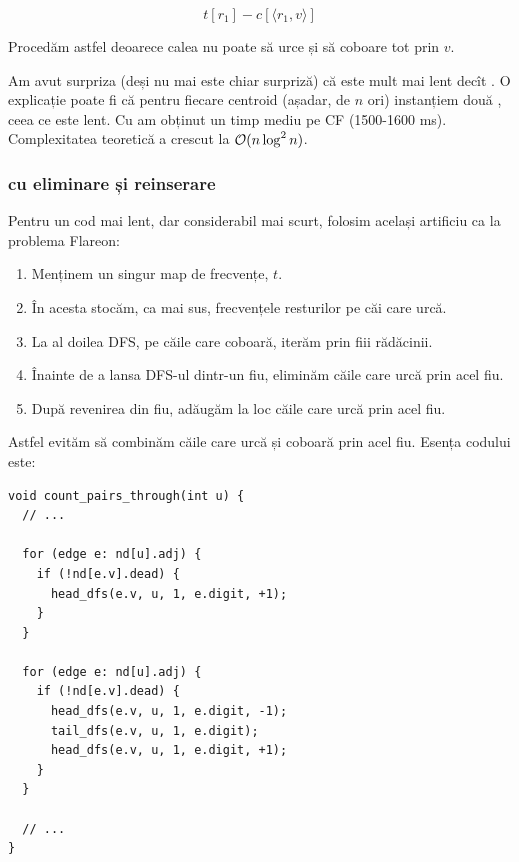 \documentclass[../main.tex]{subfiles}
\begin{document}
$$t[r_1] - c[\langle r_1, v \rangle]$$

Procedăm astfel deoarece calea nu poate să urce și să coboare tot prin $v$.

Am avut surpriza (deși nu mai este chiar surpriză) că  este mult mai lent decît . O explicație poate fi că pentru fiecare centroid (așadar, de $n$ ori) instanțiem două , ceea ce este lent. Cu  am obținut un timp mediu pe CF (1500-1600 ms). Complexitatea teoretică a crescut la $\mathcal{O}(n \log^2 n)$.

\subsubsection*{ cu eliminare și reinserare}

Pentru un cod mai lent, dar considerabil mai scurt, folosim același artificiu ca la problema Flareon:

\begin{enumerate}
  \item Menținem un singur map de frecvențe, $t$.

  \item În acesta stocăm, ca mai sus, frecvențele resturilor pe căi care urcă.

  \item La al doilea DFS, pe căile care coboară, iterăm prin fiii rădăcinii.

  \item Înainte de a lansa DFS-ul dintr-un fiu, eliminăm căile care urcă prin acel fiu.

  \item După revenirea din fiu, adăugăm la loc căile care urcă prin acel fiu.
\end{enumerate}

Astfel evităm să combinăm căile care urcă și coboară prin acel fiu. Esența codului este:

\begin{verbatim}
void count_pairs_through(int u) {
  // ...

  for (edge e: nd[u].adj) {
    if (!nd[e.v].dead) {
      head_dfs(e.v, u, 1, e.digit, +1);
    }
  }

  for (edge e: nd[u].adj) {
    if (!nd[e.v].dead) {
      head_dfs(e.v, u, 1, e.digit, -1);
      tail_dfs(e.v, u, 1, e.digit);
      head_dfs(e.v, u, 1, e.digit, +1);
    }
  }

  // ...
}
\end{verbatim}
\end{document}
